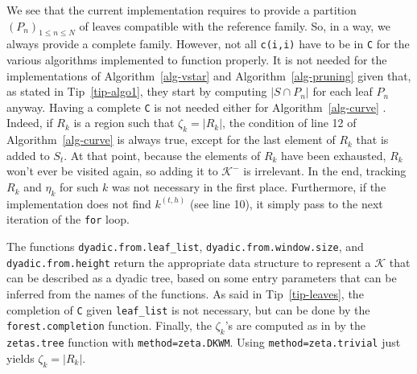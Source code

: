 \documentclass[
  11pt,
  a4paper,
]{article}
\theoremstyle{plain}
\theoremstyle{definition}
\theoremstyle{plain}
\theoremstyle{definition}
\theoremstyle{plain}
\theoremstyle{remark}
\newcounter{quartocallouttipno}
\newcommand{\quartocallouttip}[1]{\refstepcounter{quartocallouttipno}\label{#1}}
\begin{document}
\begin{tcolorbox}[enhanced jigsaw, leftrule=.75mm, bottomtitle=1mm, left=2mm, coltitle=black, bottomrule=.15mm, opacityback=0, colbacktitle=quarto-callout-tip-color!10!white, breakable, titlerule=0mm, colframe=quarto-callout-tip-color-frame, colback=white, arc=.35mm, toptitle=1mm, rightrule=.15mm, opacitybacktitle=0.6, title=\textcolor{quarto-callout-tip-color}{\faLightbulb}\hspace{0.5em}{Tip \ref*{tip-leaves} }, toprule=.15mm]

\quartocallouttip{tip-leaves} 

We see that the current implementation requires to provide a partition
\((P_n)_{1\leq n \leq N}\) of leaves compatible with the reference
family. So, in a way, we always provide a complete family. However, not
all \texttt{c(i,i)} have to be in \texttt{C} for the various algorithms
implemented to function properly. It is not needed for the
implementations of  Algorithm~\ref{alg-vstar}  and
 Algorithm~\ref{alg-pruning}  given that, as stated in
Tip~\ref{tip-algo1}, they start by computing \(|S\cap P_n|\) for each
leaf \(P_n\) anyway. Having a complete \texttt{C} is not needed either
for  Algorithm~\ref{alg-curve} . Indeed, if \(R_k\) is a region such
that \(\zeta_k=|R_k|\), the condition of line 12 of
 Algorithm~\ref{alg-curve}  is always true, except for the last element
of \(R_k\) that is added to \(S_t\). At that point, because the elements
of \(R_k\) have been exhausted, \(R_k\) won't ever be visited again, so
adding it to \(\mathcal{K}^-\) is irrelevant. In the end, tracking
\(R_k\) and \(\eta_k\) for such \(k\) was not necessary in the first
place. Furthermore, if the implementation does not find \(k^{(t,h)}\)
(see line 10), it simply pass to the next iteration of the \texttt{for}
loop.

\end{tcolorbox}

The functions \texttt{dyadic.from.leaf\_list},
\texttt{dyadic.from.window.size}, and \texttt{dyadic.from.height} return
the appropriate data structure to represent a \(\mathcal{K}\) that can
be described as a dyadic tree, based on some entry parameters that can
be inferred from the names of the functions. As said in
Tip~\ref{tip-leaves}, the completion of \texttt{C} given
\texttt{leaf\_list} is not necessary, but can be done by the
\texttt{forest.completion} function. Finally, the \(\zeta_k\)'s are
computed as in \citet{MR4178188} by the \texttt{zetas.tree} function
with \texttt{method=zeta.DKWM}. Using \texttt{method=zeta.trivial} just
yields \(\zeta_k=|R_k|\).
\end{document}
